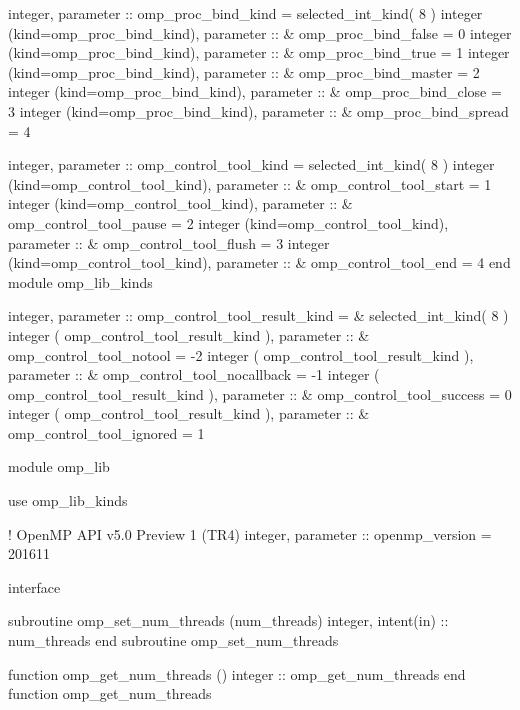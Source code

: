 {{\begin{codepar}
        integer, parameter :: omp\_proc\_bind\_kind = selected\_int\_kind( 8 )
        integer (kind=omp\_proc\_bind\_kind), parameter ::
      \&   omp\_proc\_bind\_false = 0
        integer (kind=omp\_proc\_bind\_kind), parameter ::
      \&   omp\_proc\_bind\_true = 1
        integer (kind=omp\_proc\_bind\_kind), parameter ::
      \&   omp\_proc\_bind\_master = 2
        integer (kind=omp\_proc\_bind\_kind), parameter ::
      \&   omp\_proc\_bind\_close = 3
        integer (kind=omp\_proc\_bind\_kind), parameter ::
      \&   omp\_proc\_bind\_spread = 4
\begin{samepage}
        integer, parameter :: omp\_control\_tool\_kind = selected\_int\_kind( 8 )
        integer (kind=omp\_control\_tool\_kind), parameter :: 
      \&   omp\_control\_tool\_start = 1
        integer (kind=omp\_control\_tool\_kind), parameter :: 
      \&   omp\_control\_tool\_pause = 2
        integer (kind=omp\_control\_tool\_kind), parameter :: 
      \&   omp\_control\_tool\_flush = 3
        integer (kind=omp\_control\_tool\_kind), parameter :: 
      \&   omp\_control\_tool\_end = 4
        end module omp\_lib\_kinds
\end{samepage}
\begin{samepage}
        integer, parameter :: omp\_control\_tool\_result\_kind = 
      \&   selected\_int\_kind( 8 )
        integer ( omp\_control\_tool\_result\_kind ), parameter :: 
      \&   omp_control_tool_notool = -2 
        integer ( omp\_control\_tool\_result\_kind ), parameter ::
      \&   omp_control_tool_nocallback = -1
        integer ( omp\_control\_tool\_result\_kind ), parameter ::
      \&   omp_control_tool_success = 0
        integer ( omp\_control\_tool\_result\_kind ), parameter ::
      \&   omp_control_tool_ignored = 1
\end{samepage}

        module omp\_lib

          use omp\_lib\_kinds

!                                     OpenMP API v5.0 Preview 1 (TR4)
          integer, parameter :: openmp\_version = 201611

         interface

          subroutine omp\_set\_num\_threads (num\_threads)
           integer, intent(in) :: num\_threads
          end subroutine omp\_set\_num\_threads

          function omp\_get\_num\_threads ()
           integer :: omp\_get\_num\_threads
          end function omp\_get\_num\_threads


\end{codepar}}}
